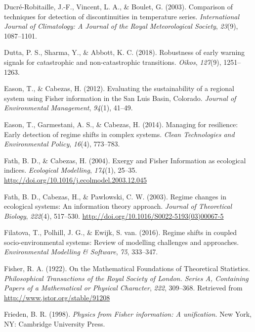 \documentclass[12pt,twoside,openany]{reedthesis}
\begin{document}
\hypertarget{ref-ducre2003comparison}{}
Ducré-Robitaille, J.-F., Vincent, L. A., \& Boulet, G. (2003).
Comparison of techniques for detection of discontinuities in temperature
series. \emph{International Journal of Climatology: A Journal of the
Royal Meteorological Society}, \emph{23}(9), 1087--1101.

\hypertarget{ref-dutta2018robustness}{}
Dutta, P. S., Sharma, Y., \& Abbott, K. C. (2018). Robustness of early
warning signals for catastrophic and non-catastrophic transitions.
\emph{Oikos}, \emph{127}(9), 1251--1263.

\hypertarget{ref-eason_evaluating_2012}{}
Eason, T., \& Cabezas, H. (2012). Evaluating the sustainability of a
regional system using Fisher information in the San Luis Basin,
Colorado. \emph{Journal of Environmental Management}, \emph{94}(1),
41--49.

\hypertarget{ref-eason2014managing}{}
Eason, T., Garmestani, A. S., \& Cabezas, H. (2014). Managing for
resilience: Early detection of regime shifts in complex systems.
\emph{Clean Technologies and Environmental Policy}, \emph{16}(4),
773--783.

\hypertarget{ref-fath_exergy_2004}{}
Fath, B. D., \& Cabezas, H. (2004). Exergy and Fisher Information as
ecological indices. \emph{Ecological Modelling}, \emph{174}(1), 25--35.
\url{http://doi.org/10.1016/j.ecolmodel.2003.12.045}

\hypertarget{ref-fath_regime_2003}{}
Fath, B. D., Cabezas, H., \& Pawlowski, C. W. (2003). Regime changes in
ecological systems: An information theory approach. \emph{Journal of
Theoretical Biology}, \emph{222}(4), 517--530.
\url{http://doi.org/10.1016/S0022-5193(03)00067-5}

\hypertarget{ref-filatova2016regime}{}
Filatova, T., Polhill, J. G., \& Ewijk, S. van. (2016). Regime shifts in
coupled socio-environmental systems: Review of modelling challenges and
approaches. \emph{Environmental Modelling \& Software}, \emph{75},
333--347.

\hypertarget{ref-fisher_mathematical_1922}{}
Fisher, R. A. (1922). On the Mathematical Foundations of Theoretical
Statistics. \emph{Philosophical Transactions of the Royal Society of
London. Series A, Containing Papers of a Mathematical or Physical
Character}, \emph{222}, 309--368. Retrieved from
\url{http://www.jstor.org/stable/91208}

\hypertarget{ref-frieden_physics_1998}{}
Frieden, B. R. (1998). \emph{Physics from Fisher information: A
unification.} New York, NY: Cambridge University Press.
\end{document}
